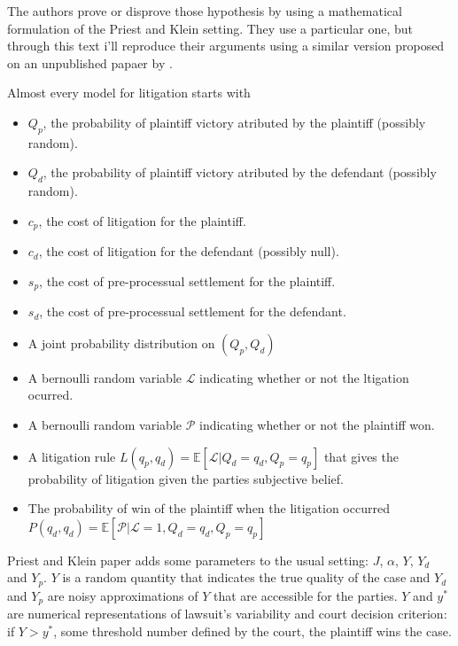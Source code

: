 \documentclass[]{report}
\providecommand{\tightlist}{%
  \setlength{\itemsep}{0pt}\setlength{\parskip}{0pt}}
\theoremstyle{definition}
\theoremstyle{definition}
\theoremstyle{definition}
\theoremstyle{remark}
\begin{document}
The authors prove or disprove those hypothesis by using a mathematical
formulation of the Priest and Klein setting. They use a particular one,
but through this text i'll reproduce their arguments using a similar
version proposed on an unpublished papaer by \citep{gelbach2016reduced}.

Almost every model for litigation starts with

\begin{itemize}
\tightlist
\item
  \(Q_p\), the probability of plaintiff victory atributed by the
  plaintiff (possibly random).
\item
  \(Q_d\), the probability of plaintiff victory atributed by the
  defendant (possibly random).
\item
  \(c_p\), the cost of litigation for the plaintiff.
\item
  \(c_d\), the cost of litigation for the defendant (possibly null).
\item
  \(s_p\), the cost of pre-processual settlement for the plaintiff.
\item
  \(s_d\), the cost of pre-processual settlement for the defendant.
\item
  A joint probability distribution on \((Q_p, Q_d)\)
\item
  A bernoulli random variable \(\mathcal{L}\) indicating whether or not
  the ltigation ocurred.
\item
  A bernoulli random variable \(\mathcal{P}\) indicating whether or not
  the plaintiff won.
\item
  A litigation rule
  \(L(q_p, q_d) = \mathbb{E}[\mathcal{L}|Q_d = q_d, Q_p = q_p]\) that
  gives the probability of litigation given the parties subjective
  belief.
\item
  The probability of win of the plaintiff when the litigation occurred
  \(P(q_d, q_d) = \mathbb{E}[\mathcal{P}|\mathcal{L}=1, Q_d = q_d, Q_p = q_p]\)
\end{itemize}

Priest and Klein paper adds some parameters to the usual setting: \(J\),
\(\alpha\), \(Y\), \(Y_d\) and \(Y_p\). \(Y\) is a random quantity that
indicates the true quality of the case and \(Y_d\) and \(Y_p\) are noisy
approximations of \(Y\) that are accessible for the parties. \(Y\) and
\(y^*\) are numerical representations of lawsuit's variability and court
decision criterion: if \(Y > y^*\), some threshold number defined by the
court, the plaintiff wins the case.
\end{document}
